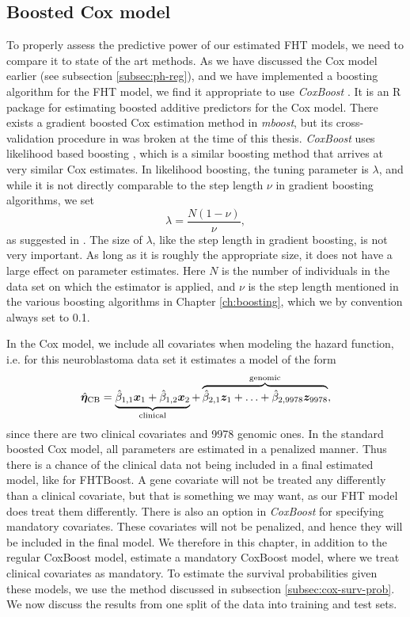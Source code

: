 \subsection{Boosted Cox model}
To properly assess the predictive power of our estimated FHT models, we need to compare it to state of the art methods.
As we have discussed the Cox model earlier (see subsection \ref{subsec:ph-reg}), and we have implemented a boosting algorithm for the FHT model, we find it appropriate to use \textit{CoxBoost} \citep{coxboost}.
It is an R package for estimating boosted additive predictors for the Cox model.
There exists a gradient boosted Cox estimation method in \textit{mboost}, but its cross-validation procedure in was broken at the time of this thesis. 
\textit{CoxBoost} uses likelihood based boosting \citep{gamboost}, which is a similar boosting method that arrives at very similar Cox estimates.
In likelihood boosting, the tuning parameter is $\lambda$, and while it is not directly comparable to the step length $\nu$ in gradient boosting algorithms, we set
\begin{equation}\label{eq:lambda-nu}
    \lambda=\frac{N(1-\nu)}{\nu},
\end{equation}
as suggested in \citet{DeBin2016}.
The size of $\lambda$, like the step length in gradient boosting, is not very important.
As long as it is roughly the appropriate size, it does not have a large effect on parameter estimates.
Here $N$ is the number of individuals in the data set on which the estimator is applied, and $\nu$ is the step length mentioned in the various boosting algorithms in Chapter \ref{ch:boosting}, which we by convention always set to 0.1.

In the Cox model, we include all covariates when modeling the hazard function, i.e. for this neuroblastoma data set it estimates a model of the form
\begin{equation*}
    \hat{\boldsymbol{\eta}}_{\text{CB}}=\underbrace{\hat{\beta}_{1,1}\bm{x}_1+\hat{\beta}_{1,2}\bm{x}_{2}}_{\text{clinical}}+\overbrace{\hat{\beta}_{2,1}\bm{z}_1+\ldots+\hat{\beta}_{2,9978}\bm{z}_{9978}}^{\text{genomic}},
\end{equation*}
since there are two clinical covariates and 9978 genomic ones.
In the standard boosted Cox model, all parameters are estimated in a penalized manner.
Thus there is a chance of the clinical data not being included in a final estimated model, like for FHTBoost.
A gene covariate will not be treated any differently than a clinical covariate, but that is something we may want, as our FHT model does treat them differently.
There is also an option in \textit{CoxBoost} for specifying mandatory covariates.
These covariates will not be penalized, and hence they will be included in the final model.
We therefore in this chapter, in addition to the regular CoxBoost model, estimate a mandatory CoxBoost model, where we treat clinical covariates as mandatory.
To estimate the survival probabilities given these models, we use the method discussed in subsection \ref{subsec:cox-surv-prob}.
We now discuss the results from one split of the data into training and test sets.

